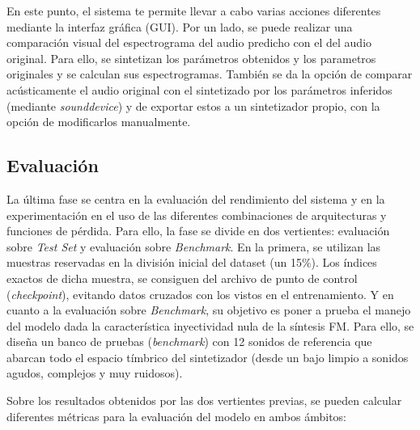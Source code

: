 En este punto, el sistema te permite llevar a cabo varias acciones diferentes mediante la 
interfaz gráfica (GUI). Por un lado, se puede realizar una comparación visual del espectrograma del audio
predicho con el del audio original. Para ello, se sintetizan los parámetros obtenidos y los parametros originales y se 
calculan sus espectrogramas. También se da la opción de comparar acústicamente el audio original con el sintetizado por los parámetros
inferidos (mediante \textit{sounddevice}) y de exportar estos a un sintetizador propio, con la opción de modificarlos manualmente. 

\subsection{Evaluación}

La última fase se centra en la evaluación del rendimiento del sistema y en la experimentación en el uso de las
diferentes combinaciones de arquitecturas y funciones de pérdida. Para ello, la fase se divide en dos vertientes:
evaluación sobre \textit{Test Set} y evaluación sobre \textit{Benchmark}. En la primera, se utilizan las muestras reservadas en la división inicial del dataset (un 15\%).
Los índices exactos de dicha muestra, se consiguen del archivo de punto de control (\textit{checkpoint}), evitando datos cruzados 
con los vistos en el entrenamiento. Y en cuanto a la evaluación sobre \textit{Benchmark}, su objetivo 
es poner a prueba el manejo del modelo dada la característica inyectividad nula de la síntesis FM. Para
ello, se diseña un banco de pruebas (\textit{benchmark}) con 12 sonidos de referencia que abarcan todo el espacio tímbrico
del sintetizador (desde un bajo limpio a sonidos agudos, complejos y muy ruidosos).

Sobre los resultados obtenidos por las dos vertientes previas, se pueden calcular diferentes métricas
para la evaluación del modelo en ambos ámbitos:

